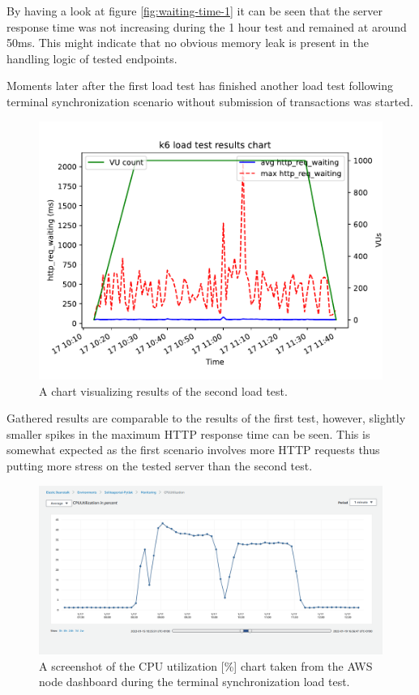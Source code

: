 \documentclass[12pt, a4paper]{article}
\begin{document}
By having a look at figure \ref{fig:waiting-time-1} it can be seen that the server response time was not increasing during the 1 hour test and remained at around 50ms.
This might indicate that no obvious memory leak is present in the handling logic of tested endpoints.

Moments later after the first load test has finished another load test following terminal synchronization scenario without submission of transactions was started.

\begin{figure}[!ht]
    \centering 
    \includegraphics[width=1\textwidth]{pdf/avg-waiting-time-2.pdf}
    \caption{A chart visualizing results of the second load test.}
    \label{fig:waiting-time-2}
\end{figure}

Gathered results are comparable to the results of the first test, however, slightly smaller spikes in the maximum HTTP response time can be seen.
This is somewhat expected as the first scenario involves more HTTP requests thus putting more stress on the tested server than the second test.

\begin{figure}[!ht]
    \centering 
    \includegraphics[width=1\textwidth]{img/node-cpu-usage.png}
    \caption{A screenshot of the CPU utilization [\%] chart taken from the AWS node dashboard during the terminal synchronization load test.}
    \label{fig:cpu-usage-1}
\end{figure}
\end{document}
